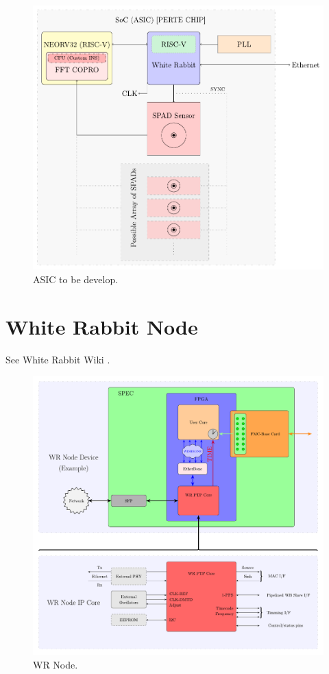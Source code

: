 \begin{figure}[H]
    \centering
    \includegraphics[width=14cm]{figures/ASIC-Scheme.pdf}
    \caption{ASIC to be develop.}
    \label{fig:ASIC}
\end{figure}

\newpage

\section{White Rabbit Node}

See White Rabbit Wiki \cite{WR:wiki}.

\begin{figure}[H]
    \centering
    \includegraphics[width=15cm]{figures/WR_node.pdf}
    \caption{WR Node.}
    \label{fig:ASIC}
\end{figure}

